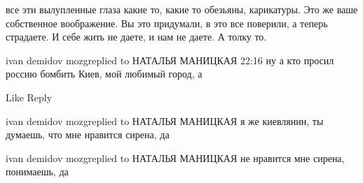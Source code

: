 все эти вылупленные глаза какие то, какие то обезьяны, карикатуры. Это же ваше
собственное воображение. Вы это придумали, в это все поверили, а теперь
страдаете. И себе жить не даете, и нам не даете. А толку то.
















ivan demidov mozgreplied to НАТАЛЬЯ МАНИЦКАЯ
22:16
ну а кто просил россию бомбить Киев, мой любимый город, а

    Like
    Reply

ivan demidov mozgreplied to НАТАЛЬЯ МАНИЦКАЯ
я же киевлянин, ты думаешь, что мне нравится сирена, да

ivan demidov mozgreplied to НАТАЛЬЯ МАНИЦКАЯ
не нравится мне сирена, понимаешь, да

